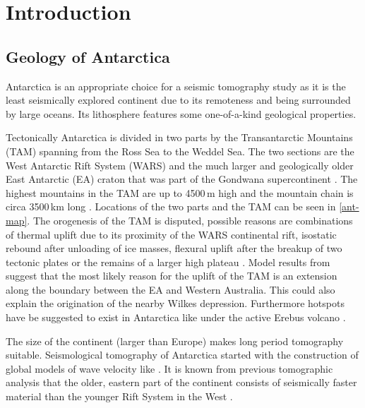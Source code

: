 

\chapter{Introduction}

\section{Geology of Antarctica}
Antarctica is an appropriate choice for a seismic tomography study as it is the least seismically explored continent 
due to its remoteness and being surrounded by large oceans. 
Its lithosphere features some one-of-a-kind geological properties. 

Tectonically Antarctica is divided in two parts by the Transantarctic Mountains (TAM) spanning from the Ross Sea to the Weddel Sea.
The two sections are the West Antarctic Rift System (WARS) and the much larger and geologically older East Antarctic (EA) craton that 
was part of the Gondwana supercontinent \citep{Gupta2009}. 
The highest mountains in the TAM are up to 4500$\,$m high and the mountain chain is circa 3500$\,$km long \citep{Morelli2004}.
Locations of the two parts and the TAM can be seen in \autoref{ant-map}.
The orogenesis %
of the TAM is disputed, possible reasons are combinations of thermal uplift due to its proximity of the WARS continental rift, 
isostatic rebound after unloading of ice masses, flexural uplift after the breakup of two tectonic plates or 
the remains of a larger high plateau \citep{VanWijk2008}.
Model results from \citealp{VanWijk2008} suggest that the most likely reason for the uplift of the TAM is an extension along the 
boundary between the EA and Western Australia. This could also explain the origination of the nearby Wilkes depression.
Furthermore hotspots have be suggested to exist in Antarctica like under the active Erebus volcano \citep{Gupta2009}.

The size of the continent (larger than Europe) makes long period tomography suitable.  
Seismological tomography of Antarctica started with the construction of global models of wave velocity like \citealp{Woodhouse1984}.
It is known from previous tomographic analysis that the older, eastern part of the continent consists of seismically faster material than 
the younger Rift System in the West \citep{Morelli2004}.

